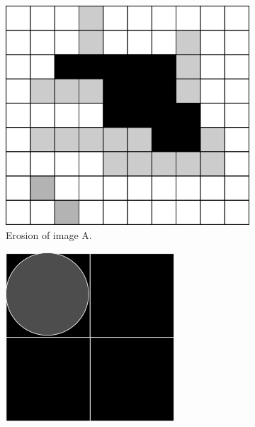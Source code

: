 \documentclass[
  digital,     %
  oneside,     %
  nosansbold,  %
  nocolorbold, %
  lof,         %
  lot,         %
]{fithesis4}
\begin{document}
\begin{figure}
\begin{subfigure}[t]{0.4\textwidth}
        \includegraphics[width=\textwidth]{resources/inkscape/opening_erosion.png}
        \caption{Erosion of image A.}
        \label{fig:opening_erosion}
    \end{subfigure}
    \begin{subfigure}[t]{0.2\textwidth}
        \centering
        \includegraphics[width=\textwidth]{resources/inkscape/opening_erosion_se.png}

\end{subfigure}
\end{figure}
\end{document}

